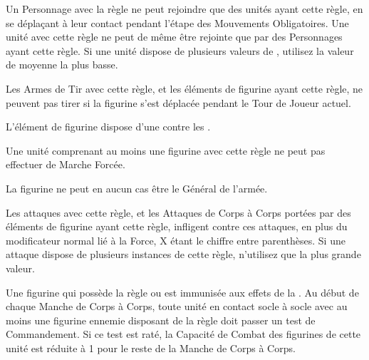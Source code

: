 Un Personnage avec la règle \randommovement{} ne peut rejoindre que des unités ayant cette règle, en se déplaçant à leur contact pendant l'étape des Mouvements Obligatoires. Une unité avec cette règle ne peut de même être rejointe que par des Personnages ayant cette règle. Si une unité dispose de plusieurs valeurs de \randommovement{}, utilisez la valeur de moyenne la plus basse.


Les Armes de Tir avec cette règle, et les éléments de figurine ayant cette règle, ne peuvent pas tirer si la figurine s'est déplacée pendant le Tour de Joueur actuel.


L'élément de figurine dispose d'une  contre les \flamingattacks{}.


Une unité comprenant au moins une figurine avec cette règle ne peut pas effectuer de Marche Forcée.


La figurine ne peut en aucun cas être le Général de l'armée.


Les attaques avec cette règle, et les Attaques de Corps à Corps portées par des éléments de figurine ayant cette règle, infligent  contre ces attaques, en plus du modificateur normal lié à la Force, X étant le chiffre entre parenthèses. Si une attaque dispose de plusieurs instances de cette règle, n'utilisez que la plus grande valeur.



 Une figurine qui possède la règle \immunetopsychology{} ou \fear{} est immunisée aux effets de la \fear{}. Au début de chaque Manche de Corps à Corps, toute unité en contact socle à socle avec au moins une figurine ennemie disposant de la règle \fear{} doit passer un test de Commandement. Si ce test est raté, la Capacité de Combat des figurines de cette unité est réduite à 1 pour le reste de la Manche de Corps à Corps.

